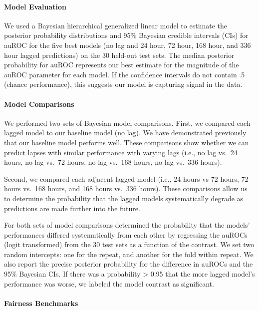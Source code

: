 \documentclass[
]{agujournal2019}
\let\oldparagraph\paragraph
\renewcommand{\paragraph}[1]{\oldparagraph{#1}\mbox{}}
\begin{document}
\paragraph{Model Evaluation}\label{model-evaluation}

We used a Bayesian hierarchical generalized linear model to estimate the
posterior probability distributions and 95\% Bayesian credible intervals
(CIs) for auROC for the five best models (no lag and 24 hour, 72 hour,
168 hour, and 336 hour lagged predictions) on the 30 held-out test sets.
The median posterior probability for auROC represents our best estimate
for the magnitude of the auROC parameter for each model. If the
confidence intervals do not contain .5 (chance performance), this
suggests our model is capturing signal in the data.

\paragraph{Model Comparisons}\label{model-comparisons}

We performed two sets of Bayesian model comparisons. First, we compared
each lagged model to our baseline model (no lag). We have demonstrated
previously that our baseline model performs well. These comparisons show
whether we can predict lapses with similar performance with varying lags
(i.e., no lag vs.~24 hours, no lag vs.~72 hours, no lag vs.~168 hours,
no lag vs.~336 hours).

Second, we compared each adjacent lagged model (i.e., 24 hours vs 72
hours, 72 hours vs.~168 hours, and 168 hours vs.~336 hours). These
comparisons allow us to determine the probability that the lagged models
systematically degrade as predictions are made further into the future.

For both sets of model comparisons determined the probability that the
models' performances differed systematically from each other by
regressing the auROCs (logit transformed) from the 30 test sets as a
function of the contrast. We set two random intercepts: one for the
repeat, and another for the fold within repeat. We also report the
precise posterior probability for the difference in auROCs and the 95\%
Bayesian CIs. If there was a probability \textgreater{} 0.95 that the
more lagged model's performance was worse, we labeled the model contrast
as significant.

\paragraph{Fairness Benchmarks}\label{fairness-benchmarks}
\end{document}

